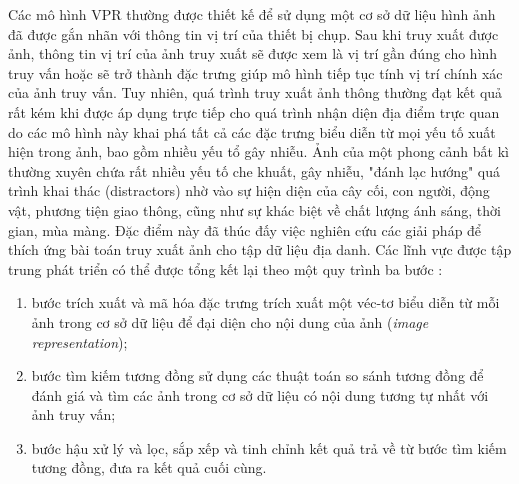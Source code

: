 Các mô hình VPR thường được thiết kế để sử dụng một cơ sở dữ liệu hình ảnh đã được gắn nhãn với thông tin vị trí của thiết bị chụp. Sau khi truy xuất được ảnh, thông tin vị trí của ảnh truy xuất sẽ được xem là vị trí gần đúng cho hình truy vấn hoặc sẽ trở thành đặc trưng giúp mô hình tiếp tục tính vị trí chính xác của ảnh truy vấn. Tuy nhiên, quá trình truy xuất ảnh thông thường đạt kết quả rất kém khi được áp dụng trực tiếp cho quá trình nhận diện địa điểm trực quan do các mô hình này khai phá tất cả các đặc trưng biểu diễn từ mọi yếu tố xuất hiện trong ảnh, bao gồm nhiều yếu tổ gây nhiễu. Ảnh của một phong cảnh bất kì thường xuyên chứa rất nhiều yếu tố che khuất, gây nhiễu, "đánh lạc hướng" quá trình khai thác (distractors) nhờ vào sự hiện diện của cây cối, con người, động vật, phương tiện giao thông, cũng như sự khác biệt về chất lượng ánh sáng, thời gian, mùa màng. Đặc điểm này đã thúc đấy việc nghiên cứu các giải pháp để thích ứng bài toán truy xuất ảnh cho tập dữ liệu địa danh. Các lĩnh vực được tập trung phát triển có thể được tổng kết lại theo một quy trình ba bước \cite{Masone2021ASO}:

\begin{enumerate}
    \item bước trích xuất và mã hóa đặc trưng trích xuất một véc-tơ biểu diễn từ mỗi ảnh trong cơ sở dữ liệu để đại diện cho nội dung của ảnh (\textit{image representation});
    \item bước tìm kiếm tương đồng sử dụng các thuật toán so sánh tương đồng để đánh giá và tìm các ảnh trong cơ sở dữ liệu có nội dung tương tự nhất với ảnh truy vấn;
    \item bước hậu xử lý và lọc, sắp xếp và tinh chỉnh kết quả trả về từ bước tìm kiếm tương đồng, đưa ra kết quả cuối cùng.
\end{enumerate}





% 

% 




